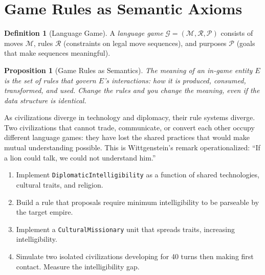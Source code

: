 \documentclass[11pt,a4paper,openany]{book}
\theoremstyle{plain}
\newtheorem{proposition}[theorem]{Proposition}
\theoremstyle{definition}
\newtheorem{definition}[theorem]{Definition}
\theoremstyle{remark}
\newenvironment{project}[1]{%
  \begin{tcolorbox}[
    title={\textbf{Project: #1}},
    colback=projectbg,
    colframe=sphereblue,
    fonttitle=\bfseries\color{white},
    coltitle=white,
    attach boxed title to top left={yshift=-2mm, xshift=4mm},
    boxed title style={colback=sphereblue, sharp corners},
    sharp corners,
    breakable,
    before upper={\normalfont\setlength{\parindent}{0pt}\tolerance=9999\hbadness=9999}
  ]
}{\end{tcolorbox}}
\newenvironment{mechanic}[1]{%
  \begin{tcolorbox}[
    title={\textbf{World Mechanic:} #1},
    colback=sphereteal!5,
    colframe=sphereteal,
    fonttitle=\bfseries\color{white},
    coltitle=white,
    sharp corners,
    breakable,
    before upper={\normalfont\setlength{\parindent}{0pt}\tolerance=9999\hbadness=9999}
  ]
}{\end{tcolorbox}}
\begin{document}
\section{Game Rules as Semantic Axioms}

\begin{definition}[Language Game]
  A \emph{language game} $\mathcal{G} = (\mathcal{M}, \mathcal{R},
  \mathcal{P})$ consists of moves $\mathcal{M}$, rules $\mathcal{R}$
  (constraints on legal move sequences), and purposes $\mathcal{P}$
  (goals that make sequences meaningful).
\end{definition}

\begin{proposition}[Game Rules as Semantics]
  The meaning of an in-game entity $E$ is the set of rules that govern
  $E$'s interactions: how it is produced, consumed, transformed, and
  used. Change the rules and you change the meaning, even if the data
  structure is identical.
\end{proposition}

\begin{mechanic}{Cultural Semantic Drift}
  As civilizations diverge in technology and diplomacy, their rule
  systems diverge. Two civilizations that cannot trade, communicate, or
  convert each other occupy different language games: they have lost the
  shared practices that would make mutual understanding possible.
  This is Wittgenstein's remark operationalized: ``If a lion could talk,
  we could not understand him.''
\end{mechanic}

\begin{project}{Cultural Semantics in Diplomacy}
  \begin{enumerate}
    \item Implement \texttt{DiplomaticIntelligibility} as a function of
          shared technologies, cultural traits, and religion.
    \item Build a rule that proposals require minimum intelligibility
          to be parseable by the target empire.
    \item Implement a \texttt{CulturalMissionary} unit that spreads
          traits, increasing intelligibility.
    \item Simulate two isolated civilizations developing for 40 turns
          then making first contact. Measure the intelligibility gap.
  \end{enumerate}
\end{project}
\end{document}
